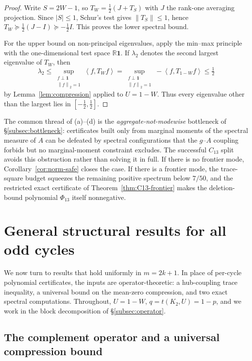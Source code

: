 \documentclass[11pt]{article}
\newcommand{\one}{\mathbf 1}
\newcommand{\ip}[2]{\left\langle #1,#2\right\rangle}
\newcommand{\norm}[1]{\left\|#1\right\|}
\begin{document}
\begin{proof}
Write $S=2W-1$, so $T_W=\tfrac12(J+T_S)$ with $J$ the rank-one averaging projection.  Since $|S|\le1$, Schur's test gives $\norm{T_S}\le1$, hence $T_W\succeq\tfrac12(J-I)\succeq-\tfrac12 I$.  This proves the lower spectral bound.

For the upper bound on non-principal eigenvalues, apply the min--max principle with the one-dimensional test space $\mathbb R\one$.  If $\lambda_2$ denotes the second largest eigenvalue of $T_W$, then
\[
        \lambda_2
        \le \sup_{\substack{f\perp\one\\ \norm f_2=1}}\ip{f}{T_Wf}
        = \sup_{\substack{f\perp\one\\ \norm f_2=1}}-\ip{f}{T_{1-W}f}
        \le \tfrac12
\]
by Lemma~\ref{lem:compression} applied to $U=1-W$.  Thus every eigenvalue other than the largest lies in $[-\tfrac12,\tfrac12]$.
\end{proof}

The common thread of \textup{(a)--(d)} is the \emph{aggregate-not-modewise} bottleneck of \S\ref{subsec:bottleneck}: certificates built only from marginal moments of the spectral measure of $A$ can be defeated by spectral configurations that the $g$--$A$ coupling forbids but no marginal-moment constraint excludes.  The successful $C_{13}$ split avoids this obstruction rather than solving it in full.  If there is no frontier mode, Corollary~\ref{cor:norm-safe} closes the case.  If there is a frontier mode, the trace-square budget squeezes the remaining positive spectrum below $7/50$, and the restricted exact certificate of Theorem~\ref{thm:C13-frontier} makes the deletion-bound polynomial $\Phi_{13}$ itself nonnegative.

\section{General structural results for all odd cycles}\label{sec:general}

We now turn to results that hold uniformly in $m=2k+1$.  In place of per-cycle polynomial certificates, the inputs are operator-theoretic: a hub-coupling trace inequality, a universal bound on the mean-zero compression, and two exact spectral computations.  Throughout, $U=1-W$, $q=t(K_2,U)=1-p$, and we work in the block decomposition of \S\ref{subsec:operator}.

\subsection{The complement operator and a universal compression bound}
\end{document}
